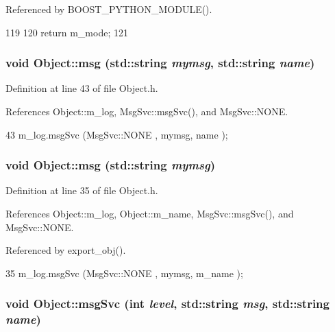 Referenced by BOOST\_\-PYTHON\_\-MODULE().


\begin{DoxyCode}
119                    {
120     return m_mode;
121   }
\end{DoxyCode}
\hypertarget{classObject_ac5d59299273cee27aacf7de00d2e7034}{
\subsubsection[{msg}]{\setlength{\rightskip}{0pt plus 5cm}void Object::msg (std::string {\em mymsg}, \/  std::string {\em name})}}
\label{classObject_ac5d59299273cee27aacf7de00d2e7034}


Definition at line 43 of file Object.h.

References Object::m\_\-log, MsgSvc::msgSvc(), and MsgSvc::NONE.


\begin{DoxyCode}
43 { m_log.msgSvc (MsgSvc::NONE    , mymsg, name ); }
\end{DoxyCode}
\hypertarget{classObject_a58b2d0618c2d08cf2383012611528d97}{
\subsubsection[{msg}]{\setlength{\rightskip}{0pt plus 5cm}void Object::msg (std::string {\em mymsg})}}
\label{classObject_a58b2d0618c2d08cf2383012611528d97}


Definition at line 35 of file Object.h.

References Object::m\_\-log, Object::m\_\-name, MsgSvc::msgSvc(), and MsgSvc::NONE.

Referenced by export\_\-obj().


\begin{DoxyCode}
35 { m_log.msgSvc (MsgSvc::NONE    , mymsg, m_name ); }
\end{DoxyCode}
\hypertarget{classObject_a3f9d5537ebce0c0f2bf6ae4d92426f3c}{
\subsubsection[{msgSvc}]{\setlength{\rightskip}{0pt plus 5cm}void Object::msgSvc (int {\em level}, \/  std::string {\em msg}, \/  std::string {\em name})}}
\label{classObject_a3f9d5537ebce0c0f2bf6ae4d92426f3c}


